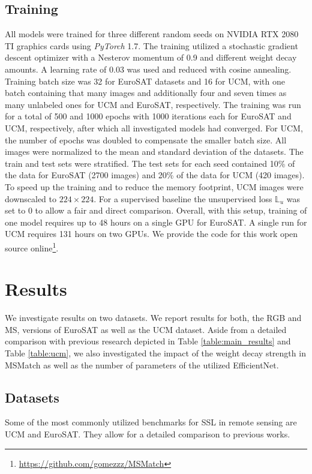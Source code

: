 \documentclass[journal]{IEEEtran}
\begin{document}
\subsection{Training}
All models were trained for three different random seeds on NVIDIA RTX 2080 TI graphics cards using \textit{PyTorch} 1.7. The training utilized a stochastic gradient descent optimizer with a Nesterov momentum of 0.9 and different weight decay amounts. A learning rate of 0.03 was used and reduced with cosine annealing. Training batch size was 32 for EuroSAT datasets and 16 for UCM, with one batch containing that many images and additionally four and seven times as many unlabeled ones for UCM and EuroSAT, respectively. The training was run for a total of 500 and 1000 epochs with 1000 iterations each for EuroSAT and UCM, respectively, after which all investigated models had converged. For UCM, the number of epochs was doubled to compensate the smaller batch size.
All images were normalized to the mean and standard deviation of the datasets. The train and test sets were stratified. The test sets for each seed contained 10\% of the data for EuroSAT (2700 images) and 20\% of the data for UCM (420 images). To speed up the training and to reduce the memory footprint, UCM images were downscaled to $224 \times 224$.
For a supervised baseline the unsupervised loss $\mathbb{L}_u$ was set to $0$ to allow a fair and direct comparison. Overall, with this setup, training of one model requires up to 48 hours on a single GPU for EuroSAT. A single run for UCM requires 131 hours on two GPUs. We provide the code for this work open source online\footnote{\url{https://github.com/gomezzz/MSMatch}}.


\section{Results}
We investigate results on two datasets. We report results for both, the RGB and MS, versions of EuroSAT as well as the UCM dataset. Aside from a detailed comparison with previous research depicted in Table \ref{table:main_results} and Table \ref{table:ucm}, we also investigated the impact of the weight decay strength in MSMatch as well as the number of parameters of the utilized EfficientNet. \\

\subsection{Datasets}
Some of the most commonly utilized benchmarks for SSL in remote sensing are UCM and EuroSAT. They allow for a detailed comparison to previous works.
\end{document}
